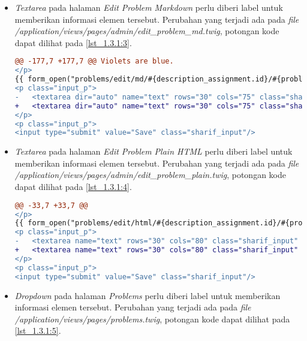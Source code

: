\begin{itemize}
	\item \textit{Textarea} pada halaman \textit{Edit Problem Markdown} perlu diberi label untuk memberikan informasi elemen tersebut. Perubahan yang terjadi ada pada \textit{file} \textit{/application/views/pages/admin/edit\_problem\_md.twig}, potongan kode dapat dilihat pada \ref{lst_1.3.1:3}.

\begin{lstlisting}[language=diff, caption=Perubahan pada \textit{file} \textit{edit\_problem\_md.twig}, label=lst_1.3.1:3, basicstyle=\ttfamily, frame=single,
columns=fullflexible, keepspaces=true, breaklines=true]
@@ -177,7 +177,7 @@ Violets are blue.
</p>
{{ form_open("problems/edit/md/#{description_assignment.id}/#{problem.id}") }}
<p class="input_p">
- 	<textarea dir="auto" name="text" rows="30" cols="75" class="sharif_input" id="md_editor">{{ problem.description }}</textarea>
+ 	<textarea dir="auto" name="text" rows="30" cols="75" class="sharif_input" id="md_editor" aria-label="Markdown Editor">{{ problem.description }}</textarea>
</p>
<p class="input_p">
<input type="submit" value="Save" class="sharif_input"/>
\end{lstlisting}

	\item \textit{Textarea} pada halaman \textit{Edit Problem Plain HTML} perlu diberi label untuk memberikan informasi elemen tersebut. Perubahan yang terjadi ada pada \textit{file} \textit{/application/views/pages/admin/edit\_problem\_plain.twig}, potongan kode dapat dilihat pada \ref{lst_1.3.1:4}.
	
\begin{lstlisting}[language=diff, caption=Perubahan pada \textit{file} \textit{edit\_problem\_plain.twig}, label=lst_1.3.1:4, basicstyle=\ttfamily, frame=single,
columns=fullflexible, keepspaces=true, breaklines=true]
@@ -33,7 +33,7 @@
</p>
{{ form_open("problems/edit/html/#{description_assignment.id}/#{problem.id}") }}
<p class="input_p">
- 	<textarea name="text" rows="30" cols="80" class="sharif_input" id="html_editor">{{ problem.description }}</textarea>
+ 	<textarea name="text" rows="30" cols="80" class="sharif_input" id="html_editor" aria-label="HTML Editor">{{ problem.description }}</textarea>
</p>
<p class="input_p">
<input type="submit" value="Save" class="sharif_input"/>
\end{lstlisting}
	
	\item \textit{Dropdown} pada halaman \textit{Problems} perlu diberi label untuk memberikan informasi elemen tersebut. Perubahan yang terjadi ada pada \textit{file} \textit{/application/views/pages/problems.twig}, potongan kode dapat dilihat pada \ref{lst_1.3.1:5}.
	

\end{itemize}
